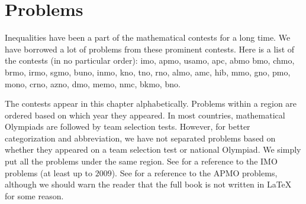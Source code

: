 \documentclass{subfile}
\begin{document}
	\chapter{Problems}\label{ch:problems}
	Inequalities have been a part of the mathematical contests for a long time. We have borrowed a lot of problems from these prominent contests. Here is a list of the contests (in no particular order): \Gls{imo}, \Gls{apmo}, \Gls{usamo}, \Gls{apc}, \Gls{abmo} \Gls{bmo}, \Gls{chmo}, \Gls{brmo}, \Gls{irmo}, \Gls{sgmo}, \Gls{buno}, \Gls{inmo}, \Gls{kno}, \Gls{tno}, \Gls{rno}, \Gls{almo}, \Gls{amc}, \Gls{hib}, \Gls{mmo}, \Gls{gno}, \Gls{pmo}, \Gls{mono}, \Gls{crno}, \Gls{azno}, \Gls{dmo}, \Gls{memo}, \Gls{nmc}, \Gls{bkmo}, \Gls{bno}.
	
	The contests appear in this chapter alphabetically. Problems within a region are ordered based on which year they appeared. In most countries, mathematical Olympiads are followed by team selection tests. However, for better categorization and abbreviation, we have not separated problems based on whether they appeared on a team selection test or national Olympiad. We simply put all the problems under the same region. See \textcite{djukicc_jankovic_matic_2011} for a reference to the IMO problems (at least up to $2009$). See \textcite{dongphd_suugaku_2009} for a reference to the APMO problems, although we should warn the reader that the full book is not written in \LaTeX{} for some reason.
\end{document}
